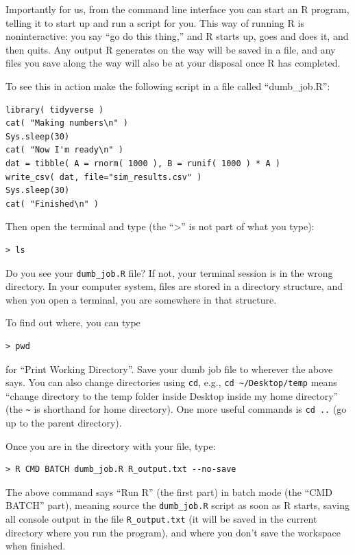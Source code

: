 \documentclass[
]{book}
\begin{document}
Importantly for us, from the command line interface you can start an R program, telling it to start up and run a script for you.
This way of running R is noninteractive: you say ``go do this thing,'' and R starts up, goes and does it, and then quits.
Any output R generates on the way will be saved in a file, and any files you save along the way will also be at your disposal once R has completed.

To see this in action make the following script in a file called ``dumb\_job.R'':

\begin{verbatim}
library( tidyverse )
cat( "Making numbers\n" )
Sys.sleep(30)
cat( "Now I'm ready\n" )
dat = tibble( A = rnorm( 1000 ), B = runif( 1000 ) * A )
write_csv( dat, file="sim_results.csv" )
Sys.sleep(30)
cat( "Finished\n" )
\end{verbatim}

Then open the terminal and type (the ``\textgreater{}'' is not part of what you type):

\begin{verbatim}
> ls
\end{verbatim}

Do you see your \texttt{dumb\_job.R} file? If not, your terminal session is in the wrong directory.
In your computer system, files are stored in a directory structure, and when you open a terminal, you are somewhere in that structure.

To find out where, you can type

\begin{verbatim}
> pwd
\end{verbatim}

for ``Print Working Directory''.
Save your dumb job file to wherever the above says.
You can also change directories using \texttt{cd}, e.g., \texttt{cd\ \textasciitilde{}/Desktop/temp} means ``change directory to the temp folder inside Desktop inside my home directory'' (the \texttt{\textasciitilde{}} is shorthand for home directory).
One more useful commands is \texttt{cd\ ..} (go up to the parent directory).

Once you are in the directory with your file, type:

\begin{verbatim}
> R CMD BATCH dumb_job.R R_output.txt --no-save
\end{verbatim}

The above command says ``Run R'' (the first part) in batch mode (the ``CMD BATCH'' part), meaning source the \texttt{dumb\_job.R} script as soon as R starts, saving all console output in the file \texttt{R\_output.txt} (it will be saved in the current directory where you run the program), and where you don't save the workspace when finished.
\end{document}
